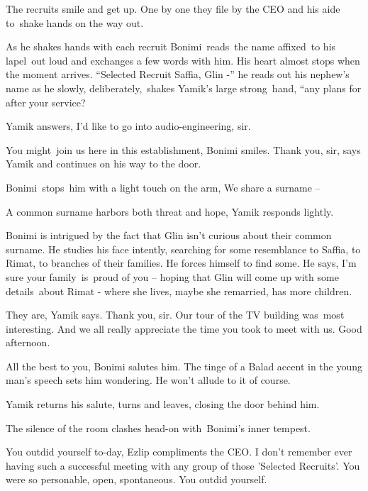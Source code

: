 \documentclass[letterpaper]{article}
\begin{document}
The recruits smile and get up. One by one they file by the CEO and his aide to~shake hands on the way out. 

As he shakes hands with each recruit Bonimi\ reads\ the name affixed\ to his lapel\ out loud and exchanges a few words
with him. His heart almost stops when the moment arrives. ``Selected Recruit Saffia, Glin -'' he reads out his nephew's
name as he slowly, deliberately,\ shakes Yamik's large strong\textcolor[rgb]{0.0,0.4392157,0.7529412}{\ }hand, ``any
plans for after your service?{\textquotedbl} 

Yamik answers, {\textquotedbl}I'd like to go into audio-engineering, sir.{\textquotedbl} 

{\textquotedbl}You might\ join us here in this establishment,{\textquotedbl} Bonimi smiles. {\textquotedbl}Thank you,
sir,{\textquotedbl} says Yamik and continues on his way to the door. 

Bonimi\textcolor{red}{\ }stops\textcolor{red}{\ }him with a light touch on the arm, {\textquotedbl}We share a surname
--{\textquotedbl} 

{\textquotedbl}A common surname harbors both threat and hope,{\textquotedbl} Yamik responds lightly.

Bonimi is intrigued by the fact that Glin isn't curious about their common surname. He studies his face intently,
searching for some resemblance to Saffia, to Rimat, to branches of their families. He forces himself to find some. He
says, {\textquotedbl}I'm sure your family\textcolor{red}{\ }is\ proud of you --{\textquotedbl} hoping that Glin will
come up with some details~about Rimat - where she lives, maybe she remarried, has more children. 

{\textquotedbl}They are,{\textquotedbl} Yamik says. {\textquotedbl}Thank you, sir. Our tour of the TV building was\ most
interesting. And we all really appreciate the time you took to meet with us. Good afternoon.{\textquotedbl} 

{\textquotedbl}All the best to you,{\textquotedbl} Bonimi salutes him. The tinge of a Balad accent in the young man's
speech sets him wondering. He won't allude to it of course. 

Yamik returns his salute, turns and leaves, closing the door behind him.

The silence of the room clashes head-on with~Bonimi's inner tempest.

{\textquotedbl}You outdid yourself to-day,{\textquotedbl} Ezlip compliments the CEO. {\textquotedbl}I don't remember
ever having such a successful meeting with any group of those {}'Selected Recruits{}'. You were so personable, open,
spontaneous. You outdid yourself.{\textquotedbl}
\end{document}
